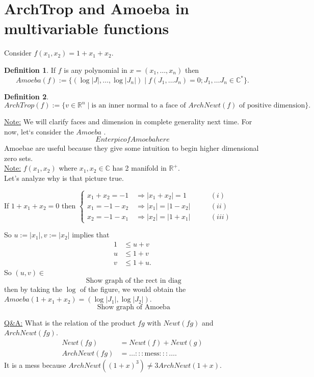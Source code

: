 \documentclass[]{article}
\theoremstyle{definition}
\newtheorem*{defn}{Definition}
\begin{document}
			\section{ArchTrop and Amoeba in multivariable functions}
			Consider $f(x_1,x_2)=1+x_1+x_2$.
			\begin{defn}
			If $f$ is any polynomial in $x=(x_1,\ldots,x_n)$ then 
			\[Amoeba(f):= \{(\log|J|,\ldots,\log|J_n|) \mid f(J_1,\dots J_n)=0; J_1,\dots J_n \in \mathbb{C}^{*} \}.\]
			\end{defn}
			\begin{defn}
			\[ArchTrop(f):= \{v\in \mathbb{R}^{n} \mid \text{is an inner normal to a face of $ArchNewt(f)$ of positive dimension}\}.\]
			\end{defn}
			\underline{Note:} We will clarify faces and dimension in complete generality next time. For now, let`s consider the $Amoeba$ .
			\[ Enter pic of Amoeba here\]
			Amoebae are useful because they give some intuition to begin higher dimensional zero sets.\\
			\underline{Note:} $f(x_1,x_2)$ where $x_1,x_2 \in \mathbb{C}$ has 2 manifold in $\mathbb{R}^{+}$.\\
			Let's analyze why is that picture true.
			\begin{center}
			If $ 1+x_1+x_2=0$ then $\begin{cases}
			x_1+x_2=-1\quad \Rightarrow |x_1+x_2|=1 \qquad &(i) \\
			x_1=-1-x_2\quad \Rightarrow |x_1|=|1-x_2| \qquad &(ii)\\
			x_2=-1-x_1\quad \Rightarrow |x_2|=|1+x_1| \qquad &(iii)
			\end{cases}
			$
			\end{center}
			So $u:= |x_1|, v:=|x_2|$ implies that 
			\begin{align*}
				1 &\leq u+v \\
				u &\leq 1+v \\
				v &\leq 1+u.
			\end{align*}
			So $(u,v) \in $
			\[ \text{ Show graph  of the rect in diag}\]
			then by taking the $\log$ of the figure, we would obtain the $Amoeba(1+x_1+x_2)=(\log|J_1|,\log|J_2|)$.
						\[ \text{ Show graph  of Amoeba}\]
			
			\underline{Q\&A:} What is the relation of the product $fg$ with $Newt(fg)$ and $ArchNewt(fg)$.
			\begin{align*}
			Newt(fg) &= Newt(f)+Newt(g) \\
			ArchNewt(fg) &= \ldots:::\text{mess}:::\ldots.
			\end{align*}
			It is a mess because $ArchNewt((1+x)^3) \neq 3ArchNewt(1+x).$
\end{document}
